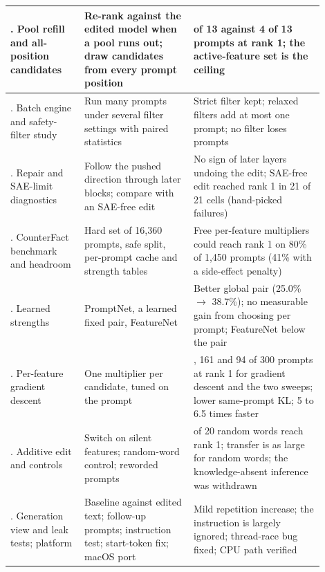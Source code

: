 \documentclass[12pt,a4paper]{report}
\begin{document}
\begin{table}[H]
{\begin{tabular}{|>{\raggedright\arraybackslash}p{0.212\linewidth}|>{\raggedright\arraybackslash}p{0.318\linewidth}|>{\raggedright\arraybackslash}p{0.371\linewidth}|}
10. Pool refill and all-position candidates & Re-rank against the edited model when a pool runs out; draw candidates from every prompt position & 10 of 13 against 4 of 13 prompts at rank 1; the active-feature set is the ceiling \\ \hline
11. Batch engine and safety-filter study & Run many prompts under several filter settings with paired statistics & Strict filter kept; relaxed filters add at most one prompt; no filter loses prompts \\ \hline
12. Repair and SAE-limit diagnostics & Follow the pushed direction through later blocks; compare with an SAE-free edit & No sign of later layers undoing the edit; SAE-free edit reached rank 1 in 21 of 21 cells (hand-picked failures) \\ \hline
13. CounterFact benchmark and headroom & Hard set of 16,360 prompts, safe split, per-prompt cache and strength tables & Free per-feature multipliers could reach rank 1 on 80\% of 1,450 prompts (41\% with a side-effect penalty) \\ \hline
14. Learned strengths & PromptNet, a learned fixed pair, FeatureNet & Better global pair (25.0\% $\rightarrow$ 38.7\%); no measurable gain from choosing per prompt; FeatureNet below the pair \\ \hline
15. Per-feature gradient descent & One multiplier per candidate, tuned on the prompt & 271, 161 and 94 of 300 prompts at rank 1 for gradient descent and the two sweeps; lower same-prompt KL; 5 to 6.5 times faster \\ \hline
16. Additive edit and controls & Switch on silent features; random-word control; reworded prompts & 20 of 20 random words reach rank 1; transfer is as large for random words; the knowledge-absent inference was withdrawn \\ \hline
17. Generation view and leak tests; platform & Baseline against edited text; follow-up prompts; instruction test; start-token fix; macOS port & Mild repetition increase; the instruction is largely ignored; thread-race bug fixed; CPU path verified \\ \hline
\end{tabular}}
\end{table}
\end{document}
